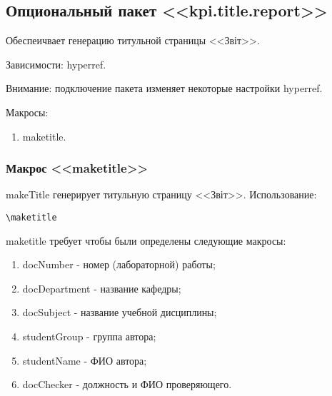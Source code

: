 \subsection{Опциональный пакет <<kpi.title.report>>}
Обеспеичвает генерацию титульной страницы <<Звіт>>.\par
Зависимости: hyperref.\par
Внимание: подключение пакета изменяет некоторые настройки hyperref.\par
Макросы:
\begin{enumerate}
\item maketitle.
\end{enumerate}
\subsubsection{Макрос <<maketitle>>}
makeTitle генерирует титульную страницу <<Звіт>>.
Использование:{\small
\begin{Verbatim}
\maketitle
\end{Verbatim}}
\normalsize
maketitle требует чтобы были определены следующие макросы:
\begin{enumerate}
\item docNumber - номер (лабораторной) работы; 
\item docDepartment - название кафедры;
\item docSubject - название учебной дисциплины;
\item studentGroup - группа автора;
\item studentName - ФИО автора;
\item docChecker - должность и ФИО проверяющего.
\end{enumerate}
